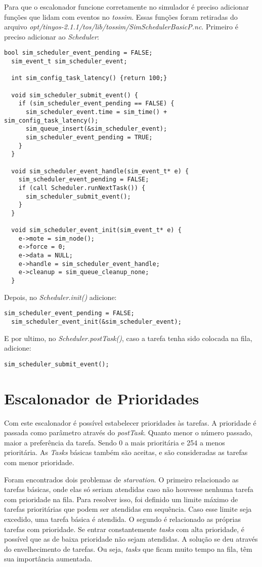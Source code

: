 \documentclass[a4paper,onecolumn, 10pt]{article}
\begin{document}
Para que o escalonador funcione corretamente no simulador é preciso adicionar funções que lidam com eventos no
\textit{tossim}. Essas funções foram retiradas do arquivo
\textit{opt/tinyos-2.1.1/tos/lib/tossim/SimSchedulerBasicP.nc}.
Primeiro é preciso adicionar ao \textit{Scheduler}:
\begin{lstlisting}[frame=single]
  bool sim_scheduler_event_pending = FALSE;
  sim_event_t sim_scheduler_event;

  int sim_config_task_latency() {return 100;}
  
  void sim_scheduler_submit_event() {
    if (sim_scheduler_event_pending == FALSE) {
      sim_scheduler_event.time = sim_time() + sim_config_task_latency();
      sim_queue_insert(&sim_scheduler_event);
      sim_scheduler_event_pending = TRUE;
    }
  }

  void sim_scheduler_event_handle(sim_event_t* e) {
    sim_scheduler_event_pending = FALSE;
    if (call Scheduler.runNextTask()) {
      sim_scheduler_submit_event();
    }
  }

  void sim_scheduler_event_init(sim_event_t* e) {
    e->mote = sim_node();
    e->force = 0;
    e->data = NULL;
    e->handle = sim_scheduler_event_handle;
    e->cleanup = sim_queue_cleanup_none;
  }
\end{lstlisting}
Depois, no \textit{Scheduler.init()} adicione:
\begin{lstlisting}[frame=single]
  sim_scheduler_event_pending = FALSE;
  sim_scheduler_event_init(&sim_scheduler_event);
\end{lstlisting}
E por ultimo, no \textit{Scheduler.postTask()}, caso a tarefa tenha sido colocada na fila, adicione:
\begin{lstlisting}[frame=single]
  sim_scheduler_submit_event();
\end{lstlisting}



\section{Escalonador de Prioridades}\label{escalonadorprioridades}
Com este escalonador é possível estabelecer prioridades às tarefas. A prioridade é passada como parâmetro através 
do \textit{postTask}. Quanto menor o número passado, maior a preferência da tarefa. Sendo 0 a
mais prioritária e 254 a menos prioritária.
As \textit{Tasks} básicas também são aceitas, e são consideradas as tarefas com menor prioridade.

Foram encontrados dois problemas de \textit{starvation}. O primeiro relacionado as tarefas básicas,
onde elas só seriam atendidas caso não houvesse nenhuma tarefa com prioridade na fila. Para resolver isso, foi definido um
limite máximo de tarefas prioritárias que podem ser atendidas em sequência. Caso esse limite seja excedido, uma tarefa
básica é atendida. O segundo é relacionado as próprias tarefas com prioridade. Se entrar constantemente \textit{tasks} com alta
prioridade, é possível que as de baixa prioridade não sejam atendidas. A solução se deu através do envelhecimento de
tarefas. Ou seja, \textit{tasks} que ficam muito tempo na fila, têm sua importância aumentada.
\end{document}
